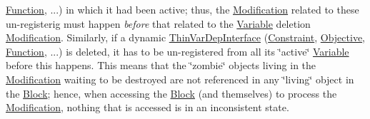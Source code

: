 \begin{DoxyEnumerate}
\mbox{\hyperlink{class_s_m_spp__di__unipi__it_1_1_function}{Function}}, ...) in which it had been active; thus, the \mbox{\hyperlink{class_s_m_spp__di__unipi__it_1_1_modification}{Modification}} related to these un-\/registerig must happen {\itshape before} that related to the \mbox{\hyperlink{class_s_m_spp__di__unipi__it_1_1_variable}{Variable}} deletion \mbox{\hyperlink{class_s_m_spp__di__unipi__it_1_1_modification}{Modification}}. Similarly, if a dynamic \mbox{\hyperlink{class_s_m_spp__di__unipi__it_1_1_thin_var_dep_interface}{Thin\+Var\+Dep\+Interface}} (\mbox{\hyperlink{class_s_m_spp__di__unipi__it_1_1_constraint}{Constraint}}, \mbox{\hyperlink{class_s_m_spp__di__unipi__it_1_1_objective}{Objective}}, \mbox{\hyperlink{class_s_m_spp__di__unipi__it_1_1_function}{Function}}, ...) is deleted, it has to be un-\/registered from all its \char`\"{}active\char`\"{} \mbox{\hyperlink{class_s_m_spp__di__unipi__it_1_1_variable}{Variable}} before this happens. This means that the \char`\"{}zombie\char`\"{} objects living in the \mbox{\hyperlink{class_s_m_spp__di__unipi__it_1_1_modification}{Modification}} waiting to be destroyed are not referenced in any \char`\"{}living\char`\"{} object in the \mbox{\hyperlink{class_s_m_spp__di__unipi__it_1_1_block}{Block}}; hence, when accessing the \mbox{\hyperlink{class_s_m_spp__di__unipi__it_1_1_block}{Block}} (and themselves) to process the \mbox{\hyperlink{class_s_m_spp__di__unipi__it_1_1_modification}{Modification}}, nothing that is accessed is in an inconsistent state.

\end{DoxyEnumerate}
